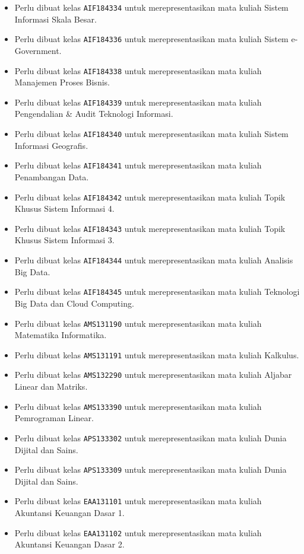 \begin{enumerate}
\begin{itemize}
		\item Perlu dibuat kelas \texttt{AIF184334} untuk merepresentasikan mata kuliah Sistem Informasi Skala Besar.
		\item Perlu dibuat kelas \texttt{AIF184336} untuk merepresentasikan mata kuliah Sistem e-Government.
		\item Perlu dibuat kelas \texttt{AIF184338} untuk merepresentasikan mata kuliah Manajemen Proses Bisnis.
		\item Perlu dibuat kelas \texttt{AIF184339} untuk merepresentasikan mata kuliah Pengendalian \& Audit Teknologi Informasi.
		\item Perlu dibuat kelas \texttt{AIF184340} untuk merepresentasikan mata kuliah Sistem Informasi Geografis.
		\item Perlu dibuat kelas \texttt{AIF184341} untuk merepresentasikan mata kuliah Penambangan Data.
		\item Perlu dibuat kelas \texttt{AIF184342} untuk merepresentasikan mata kuliah Topik Khusus Sistem Informasi 4.
		\item Perlu dibuat kelas \texttt{AIF184343} untuk merepresentasikan mata kuliah Topik Khusus Sistem Informasi 3.
		\item Perlu dibuat kelas \texttt{AIF184344} untuk merepresentasikan mata kuliah Analisis Big Data.
		\item Perlu dibuat kelas \texttt{AIF184345} untuk merepresentasikan mata kuliah Teknologi Big Data dan Cloud Computing.
		\item Perlu dibuat kelas \texttt{AMS131190} untuk merepresentasikan mata kuliah Matematika Informatika.
		\item Perlu dibuat kelas \texttt{AMS131191} untuk merepresentasikan mata kuliah Kalkulus.
		\item Perlu dibuat kelas \texttt{AMS132290} untuk merepresentasikan mata kuliah Aljabar Linear dan Matriks.
		\item Perlu dibuat kelas \texttt{AMS133390} untuk merepresentasikan mata kuliah Pemrograman Linear.
		\item Perlu dibuat kelas \texttt{APS133302} untuk merepresentasikan mata kuliah Dunia Dijital dan Sains.
		\item Perlu dibuat kelas \texttt{APS133309} untuk merepresentasikan mata kuliah Dunia Dijital dan Sains.
		\item Perlu dibuat kelas \texttt{EAA131101} untuk merepresentasikan mata kuliah Akuntansi Keuangan Dasar 1.
		\item Perlu dibuat kelas \texttt{EAA131102} untuk merepresentasikan mata kuliah Akuntansi Keuangan Dasar 2.

\end{itemize}
\end{enumerate}
